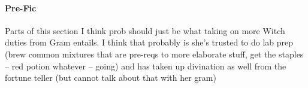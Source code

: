   \paragraph{Pre-Fic}
  Parts of this section I think prob should just be what taking on more Witch duties from Gram entails. I think that probably is she's trusted to do lab prep (brew common mixtures that are pre-reqs to more elaborate stuff, get the staples -- red potion whatever -- going) and has taken up divination as well from the fortune teller (but cannot talk about that with her gram)
